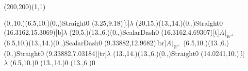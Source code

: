 \unitlength=1bp%

\begin{feynartspicture}(200,200)(1,1)

\FADiagram{}
\FAProp(0.,10.)(6.5,10.)(0.,){Straight}{0}
\FALabel(3.25,9.18)[t]{$\lambda$}
\FAProp(20,15.)(13.,14.)(0.,){Straight}{0}
\FALabel(16.3162,15.3069)[b]{$\lambda$}
\FAProp(20,5.)(13.,6.)(0.,){ScalarDash}{0}
\FALabel(16.3162,4.69307)[t]{$A|_{W^\perp}$}
\FAProp(6.5,10.)(13.,14.)(0.,){ScalarDash}{0}
\FALabel(9.33882,12.9682)[br]{$A|_{W^\perp}$}
\FAProp(6.5,10.)(13.,6.)(0.,){Straight}{0}
\FALabel(9.33882,7.03184)[tr]{$\lambda$}
\FAProp(13.,14.)(13.,6.)(0.,){Straight}{0}
\FALabel(14.0241,10.)[l]{$\lambda$}
\FAVert(6.5,10.){0}
\FAVert(13.,14.){0}
\FAVert(13.,6.){0}
\end{feynartspicture}

